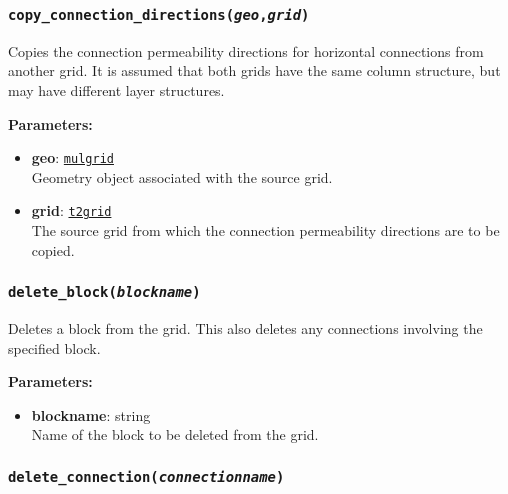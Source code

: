 \begin{snugshade}
\subsubsection{\texttt{copy\_connection\_directions(\emph{geo},\emph{grid})}}
\end{snugshade}
\label{sec:t2grid:copy_connection_directions}

Copies the connection permeability directions for horizontal connections from another grid.  It is assumed that both grids have the same column structure, but may have different layer structures.

\textbf{Parameters:}
\begin{itemize}
\item \textbf{geo}: \hyperref[mulgrids]{\texttt{mulgrid}}\\
  Geometry object associated with the source grid.
\item \textbf{grid}: \hyperref[t2grids]{\texttt{t2grid}}\\
  The source grid from which the connection permeability directions are to be copied.
\end{itemize}

\begin{snugshade}
\subsubsection{\texttt{delete\_block(\emph{blockname})}}
\end{snugshade}
\label{sec:t2grid:delete_block}

Deletes a block from the grid.  This also deletes any connections involving the specified block.

\textbf{Parameters:}
\begin{itemize}
\item \textbf{blockname}: string\\
  Name of the block to be deleted from the grid.
\end{itemize}

\begin{snugshade}
\subsubsection{\texttt{delete\_connection(\emph{connectionname})}}
\end{snugshade}
\label{sec:t2grid:delete_connection}

